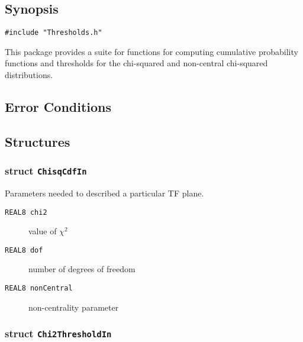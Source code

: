 \subsection*{Synopsis}
\begin{verbatim}
#include "Thresholds.h"
\end{verbatim}

\noindent This package provides a suite for functions for computing cumulative
probability functions and thresholds for the chi-squared and non-central
chi-squared distributions.

\subsection*{Error Conditions}


\subsection*{Structures}

\subsubsection*{struct \texttt{ChisqCdfIn}}

\noindent Parameters needed to described a particular TF plane.

\begin{description}
\item[\texttt{REAL8     chi2}] value of $\chi^2$
\item[\texttt{REAL8     dof}]  number of degrees of freedom
\item[\texttt{REAL8     nonCentral}]  non-centrality parameter
\end{description}

\subsubsection*{struct \texttt{Chi2ThresholdIn}}


